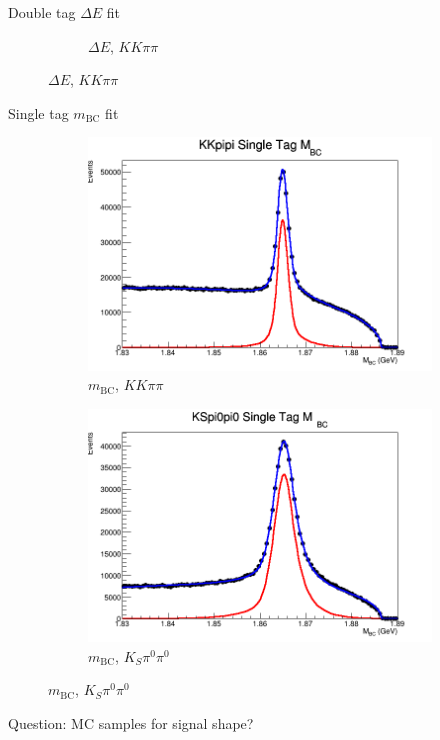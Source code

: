 \documentclass{beamer}
\begin{document}
\begin{frame}{Double tag $\Delta E$ fit}
\begin{figure}
\begin{subfigure}{0.4\textwidth}
      \caption{$\Delta E$, $KK\pi\pi$}
    \end{subfigure}
  \end{figure}
\end{frame}

\begin{frame}{Single tag $m_\text{BC}$ fit}
  \begin{figure}
    \centering
    \begin{subfigure}{0.5\textwidth}
      \centering
      \includegraphics[width=\textwidth]{KKpipiMBCFit.png}
      \caption{$m_\text{BC}$, $KK\pi\pi$}
    \end{subfigure}%
    \begin{subfigure}{0.5\textwidth}
      \centering
      \includegraphics[width=\textwidth]{KSpi0pi0MBCFit.png}
      \caption{$m_\text{BC}$, $K_S\pi^0\pi^0$}
    \end{subfigure}
  \end{figure}
  Question: MC samples for signal shape?
\end{frame}
\end{document}
